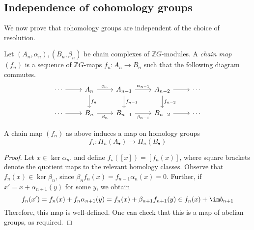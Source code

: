 \subsection{Independence of cohomology groups}
We now prove that cohomology groups are independent of the choice of resolution.
\begin{definition}
    Let \( (A_n, \alpha_n), (B_n, \beta_n) \) be chain complexes of \( \mathbb Z G \)-modules.
    A \emph{chain map} \( (f_n) \) is a sequence of \( \mathbb Z G \)-maps \( f_n : A_n \to B_n \) such that the following diagram commutes.
\[\begin{tikzcd}
	\cdots & {A_n} & {A_{n-1}} & {A_{n-2}} & \cdots \\
	\cdots & {B_n} & {B_{n-1}} & {B_{n-2}} & \cdots
	\arrow[from=1-1, to=1-2]
	\arrow["{\alpha_n}", from=1-2, to=1-3]
	\arrow[from=2-1, to=2-2]
	\arrow["{\beta_n}"', from=2-2, to=2-3]
	\arrow["{f_n}", from=1-2, to=2-2]
	\arrow["{f_{n-1}}", from=1-3, to=2-3]
	\arrow["{\beta_{n-1}}"', from=2-3, to=2-4]
	\arrow[from=2-4, to=2-5]
	\arrow["{\alpha_{n-1}}", from=1-3, to=1-4]
	\arrow[from=1-4, to=1-5]
	\arrow["{f_{n-2}}", from=1-4, to=2-4]
\end{tikzcd}\]
\end{definition}
\begin{lemma}
    A chain map \( (f_n) \) as above induces a map on homology groups
    \[ f_\star : H_n(A_\bullet) \to H_n(B_\bullet) \]
\end{lemma}
\begin{proof}
    Let \( x \in \ker \alpha_n \), and define \( f_\star([x]) = [f_n(x)] \), where square brackets denote the quotient maps to the relevant homology classes.
    Observe that \( f_n(x) \in \ker \beta_n \), since \( \beta_n f_n(x) = f_{n-1} \alpha_n(x) = 0 \).
    Further, if \( x' = x + \alpha_{n+1}(y) \) for some \( y \), we obtain
    \[ f_n(x') = f_n(x) + f_n \alpha_{n+1}(y) = f_n(x) + \beta_{n+1} f_{n+1}(y) \in f_n(x) + \im b_{n+1} \]
    Therefore, this map is well-defined.
    One can check that this is a map of abelian groups, as required.
\end{proof}
